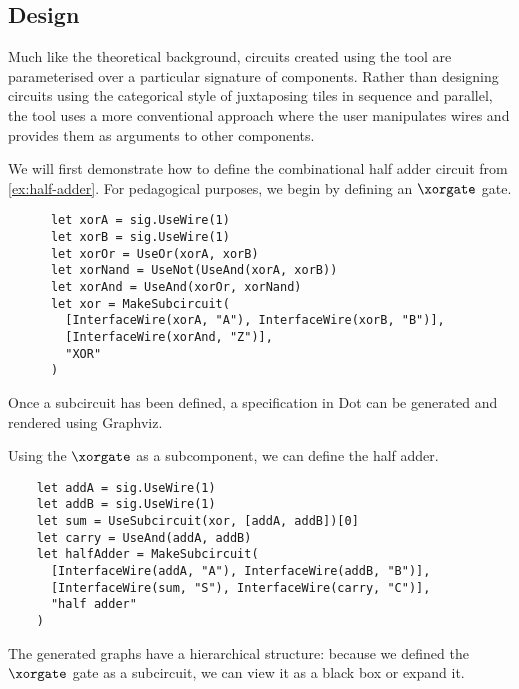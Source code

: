 \subsection{Design}

Much like the theoretical background, circuits created using the tool are
parameterised over a particular signature of components.
Rather than designing circuits using the categorical style of juxtaposing
tiles in sequence and parallel, the tool uses a more conventional approach
where the user manipulates wires and provides them as arguments to other
components.

\begin{example}
  We will first demonstrate how to define the combinational half adder circuit
  from \cref{ex:half-adder}.
  For pedagogical purposes, we begin by defining an \(\xorgate\) gate.
  \begin{lstlisting}
      let xorA = sig.UseWire(1)
      let xorB = sig.UseWire(1)
      let xorOr = UseOr(xorA, xorB)
      let xorNand = UseNot(UseAnd(xorA, xorB))
      let xorAnd = UseAnd(xorOr, xorNand)
      let xor = MakeSubcircuit(
        [InterfaceWire(xorA, "A"), InterfaceWire(xorB, "B")],
        [InterfaceWire(xorAnd, "Z")],
        "XOR"
      )
    \end{lstlisting}

  Once a subcircuit has been defined, a specification in Dot can be generated
  and rendered using Graphviz.

  \begin{center}
    
  \end{center}

  Using the \(\xorgate\) as a subcomponent, we can define the half adder.

  \begin{lstlisting}
    let addA = sig.UseWire(1)
    let addB = sig.UseWire(1)
    let sum = UseSubcircuit(xor, [addA, addB])[0]
    let carry = UseAnd(addA, addB)
    let halfAdder = MakeSubcircuit(
      [InterfaceWire(addA, "A"), InterfaceWire(addB, "B")],
      [InterfaceWire(sum, "S"), InterfaceWire(carry, "C")],
      "half adder"
    )
    \end{lstlisting}

  The generated graphs have a hierarchical structure: because we defined the
  \(\xorgate\) gate as a subcircuit, we can view it as a black box or
  expand it.

  \begin{center}
    

    \vspace{1em}

    
  \end{center}
\end{example}

